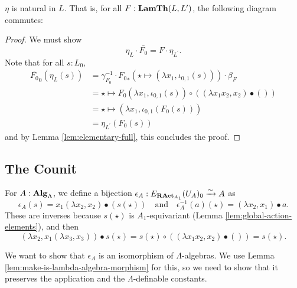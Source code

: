 \begin{lemma}
  $ \eta $ is natural in $ L $. That is, for all $ F: \mathbf{LamTh}(L, L^\prime) $, the following diagram commutes:
  \begin{center}
  \end{center}
\end{lemma}
\begin{proof}
  We must show
  \[ \eta_L \cdot \bar{F_0} = F \cdot \eta_{L^\prime}. \]
  Note that for all $ s : L_0 $,
  \begin{align*}
    \bar{F_0}_0(\eta_L(s))
    &= \gamma_{F_0}^{-1} \cdot {F_0}_*(\star \mapsto (\lambda x_1, \iota_{0, 1}(s))) \cdot \beta_F\\
    &= \star \mapsto F_0(\lambda x_1, \iota_{0, 1}(s)) \circ ((\lambda x_1 x_2, x_2) \bullet ())\\
    &= \star \mapsto (\lambda x_1, \iota_{0, 1}(F_0(s)))\\
    &= \eta_{L^\prime}(F_0(s))
  \end{align*}
  and by Lemma \ref{lem:elementary-full}, this concludes the proof.
\end{proof}

\subsection{The Counit}

\begin{definition}
  For $ A : \mathbf{Alg}_{\Lambda} $, we define a bijection $ \epsilon_A : E_{\mathbf{RAct}_{A_1}}(U_A)_0 \xrightarrow \sim A $ as
  \[ \epsilon_A(s) = x_1 (\lambda x_2, x_2) \bullet (s(\star)) \quad \text{and} \quad \epsilon_A^{-1}(a)(\star) = (\lambda x_2, x_1) \bullet a. \]
  These are inverses because $ s(\star) $ is $ A_1 $-equivariant (Lemma \ref{lem:global-action-elements}), and then
  \[ (\lambda x_2, x_1 (\lambda x_3, x_3)) \bullet s(\star) = s(\star) \circ ((\lambda x_1 x_2, x_2) \bullet ()) = s(\star). \]
\end{definition}

We want to show that $ \epsilon_A $ is an isomorphism of $ \Lambda $-algebras. We use Lemma \ref{lem:make-is-lambda-algebra-morphism} for this, so we need to show that it preserves the application and the $ \Lambda $-definable constants.

